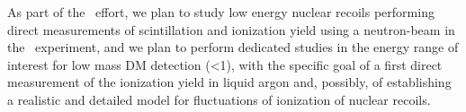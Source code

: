 As part of the \DSks\ effort, we plan to study low energy nuclear recoils performing direct measurements of scintillation and ionization yield using a neutron-beam in the \ReD\ experiment, 
and we  plan to perform dedicated studies in the energy range of interest for low mass DM detection (\SI{<1}{\keVr}), with the specific goal of a first direct measurement of the ionization yield in liquid argon and, possibly, of establishing a realistic and detailed model for fluctuations of ionization of nuclear recoils.

